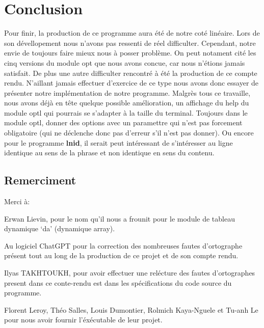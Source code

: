 \documentclass[12pt]{article}
\begin{document}
    \newpage

    \section{Conclusion}

    Pour finir, la production de ce programme aura été de notre coté linéaire. 
    Lors de son dévellopement nous n'avons pas ressenti de réel difficulter. 
    Cependant, notre envie de toujours faire mieux nous à posser problème. On 
    peut notament cité les cinq versions du module opt que nous avons concue, 
    car nous n'étions jamais satisfait. De plus une autre difficulter rencontré
    à été la production de ce compte rendu. N'aillant jamais effectuer 
    d'exercice de ce type nous avons donc essayer de présenter notre 
    implémentation de notre programme. Malgrès tous ce travaille, nous avons 
    déjà en tête quelque possible amélioration, un affichage du help du module 
    optl qui pourrais se s'adapter à la taille du terminal. Toujours dans le 
    module optl, donner des options avec un paramettre qui n'est pas forcement 
    obligatoire (qui ne déclenche donc pas d'erreur s'il n'est pas donner). Ou 
    encore pour le programme \textbf{lnid}, il serait peut intéressant de 
    s'intéresser au ligne identique au sens de la phrase et non identique en 
    sens du contenu.

    \subsection{Remerciment}

    Merci à: 

    Erwan Lievin, pour le nom qu'il nous a frounit pour le module de tableau 
    dynamique `da' (dynamique array).

    Au logiciel ChatGPT pour la correction des nombreuses fautes d'ortographe 
    présent tout au long de la production de ce projet et de son compte rendu.

    Ilyas TAKHTOUKH, pour avoir effectuer une relécture des fautes 
    d'ortographes present dans ce conte-rendu est dans les spécifications du 
    code source du programme. 

    Florent Leroy, Théo Salles, Louis Dumontier, Rolmich Kaya-Nguele et Tu-anh 
    Le pour nous avoir fournir l'éxécutable de leur projet.  
\end{document}
